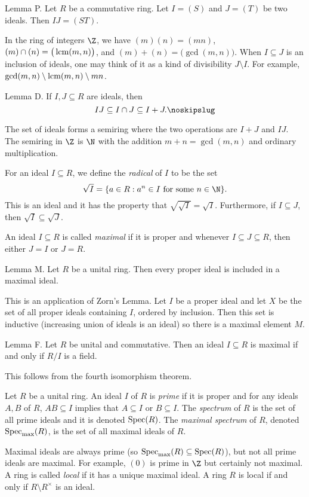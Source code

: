 \proclaim Lemma P. Let $R$ be a commutative ring. Let $I = (S)$ and $J = (T)$ be two ideals. Then $IJ = (ST)$. \slug

In the ring of integers $\Z$, we have $(m)(n) = (mn)$, $(m)\cap(n) = \big(\mathop {\rm lcm}(m,n)\big)$, and $(m)+(n) = \big(\gcd(m,n)\big)$. When $I\subseteq J$ is an inclusion of ideals, one may think of it as a kind of divisibility $J\setminus I$. For example, $\gcd(m,n)\setminus \mathop {\rm lcm}(m,n)\setminus mn$.

\proclaim Lemma D. If $I,J\subseteq R$ are ideals, then
$$IJ \subseteq I\cap J \subseteq I+J.\noskipslug$$

The set of ideals forms a semiring where the two operations are $I+J$ and $IJ$. The semiring in $\Z$ is $\N$ with the addition $m + n = \gcd(m,n)$ and ordinary multiplication.

For an ideal $I\subseteq R$, we define the {\it radical} of $I$ to be the set
$$\sqrt{I} = \{a \in R : a^n \in I\ \hbox{for some}\ n\in \N\}.$$
This is an ideal and it has the property that $\sqrt{\sqrt{I}} = \sqrt{I}$. Furthermore, if $I\subseteq J$, then $\sqrt{I} \subseteq \sqrt{J}$.

An ideal $I\subseteq R$ is called {\it maximal} if it is proper and whenever $I\subseteq J\subseteq R$, then either $J = I$ or $J=R$.

\proclaim Lemma M. Let $R$ be a unital ring. Then every proper ideal is included in a maximal ideal.

\proof This is an application of Zorn's Lemma. Let $I$ be a proper ideal and let $X$ be the set of all proper ideals containing $I$, ordered by inclusion. Then this set is inductive (increasing union of ideals is an ideal) so there is a maximal element $M$.\slug

\proclaim Lemma F. Let $R$ be unital and commutative. Then an ideal $I\subseteq R$ is maximal if and only if $R/I$ is a field.

\proof This follows from the fourth isomorphism theorem.\slug

Let $R$ be a unital ring. An ideal $I$ of $R$ is {\it prime} if it is proper and for any ideals $A,B$ of $R$, $AB\subseteq I$ implies that $A\subseteq I$ or $B\subseteq I$. The {\it spectrum} of $R$ is the set of all prime ideals and it is denoted $\mathop {\rm Spec}(R)$. The {\it maximal spectrum} of $R$, denoted $\mathop {\rm Spec}_{\max}(R)$, is the set of all maximal ideals of $R$.

Maximal ideals are always prime (so $\mathop {\rm Spec}_{\max}(R) \subseteq \mathop {\rm Spec}(R)$), but not all prime ideals are maximal. For example, $(0)$ is prime in $\Z$ but certainly not maximal. A ring is called {\it local} if it has a unique maximal ideal. A ring $R$ is local if and only if $R\setminus R^\times$ is an ideal.

